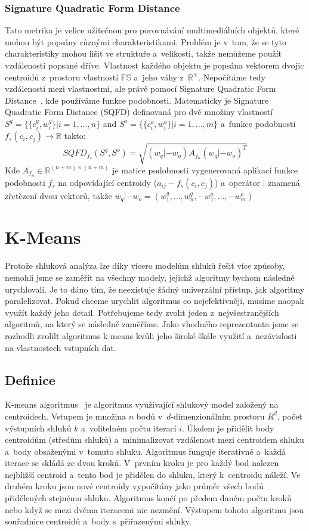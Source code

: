 \subsubsection{Signature Quadratic Form Distance}
Tato metrika je velice užitečnou pro porovnávání multimediálních objektů, které mohou být popsány různými charakteristikami. Problém je v~tom, že se tyto charakteristiky mohou lišit ve struktuře a~velikosti, takže nemůžeme použít vzdálenosti popsané dříve. Vlastnost každého objektu je popsána vektorem dvojic centroidů z~prostoru vlastností $\mathbb{FS}$ a~jeho váhy z~$\mathbb{R^{+}}$.
Nepočítáme tedy vzdálenosti mezi vlastnostmi, ale právě pomocí Signature Quadratic Form Distance~\cite{Beecks10}, kde používáme funkce podobnosti.
Matematicky je Signature Quadratic Form Distance (SQFD) definovaná pro dvě množiny vlastností $S^{q} = \{\{c_i^q, w_i^q\}|i=1,...,n\}$ and $S^{o} = \{\{c_i^o, w_i^o\}|i=1,...,m\}$ a~funkce podobnosti $f_s(c_i, c_j)\to \mathbb{R}$ takto:
$$SQFD_{f_s}(S^q,S^o)=\sqrt{(w_q|-w_o)A_{f_n}(w_q|-w_o)^T}$$
Kde $A_{f_n} \in \mathbb{R}^{(n+m)\times(n+m)}$ je matice podobnosti vygenerovaná aplikací funkce podobnosti $f_s$ na odpovídající centroidy  ($a_{ij}-f_s(c_i,c_j)$) a~operátor $|$ znamená zřetězení dvou vektorů, takže $w_q|-w_o = (w_1^q,...,w_n^q,-w_1^o,...,-w_m^o)$\\

\section{K-Means} 
Protože shluková analýza lze díky vícero modelům shluků řešit více způsoby, nemohli jsme se zaměřit na všechny modely, jejichž algoritmy bychom následně urychlovali. Je to dáno tím, že neexistuje žádný univerzální přístup, jak algoritmy paralelizovat. Pokud chceme urychlit algoritmus co nejefektivněji, musíme naopak využít každý jeho detail. Potřebujeme tedy zvolit jeden z~nej\-vše\-stra\-něj\-ších algoritmů, na který se následně zaměříme. Jako vhodného reprezentanta jsme se rozhodli zvolilt algoritmus k-means kvůli jeho široké škále využití a~nezávislosti na vlastnostech vstupních dat. \\

\subsection{Definice}
K-means algoritmus~\cite{Aggarwal13, Tan05} je algoritmus využívající shlukový model založený na centroidech. Vstupem je množina $n$ bodů v~$d$-dimenzionálním prostoru $R^d$, počet výstupních shluků $k$ a~volitelném počtu iterací $i$.
Úkolem je přidělit body centroidům (středům shluků) a~minimalizovat vzdálenost mezi centroidem shluku a~body obsaženými v~tomuto shluku. Algoritmus funguje iterativně a~každá i\-te\-ra\-ce se skládá ze dvou kroků. V~prvním kroku je pro každý bod nalezen nejbližší centroid a~tento bod je přidělen do shluku, který k~centroidu náleží. Ve druhém kroku jsou nové centroidy vypočítány jako průměr všech bodů přidělených stej\-né\-mu shluku. Algoritmus končí po předem daném počtu kroků nebo když se mezi dvěma iteracemi nic nezmění.
Výstupem tohoto algoritmu jsou souřadnice centroidů a~body s~přiřazenými shluky.

